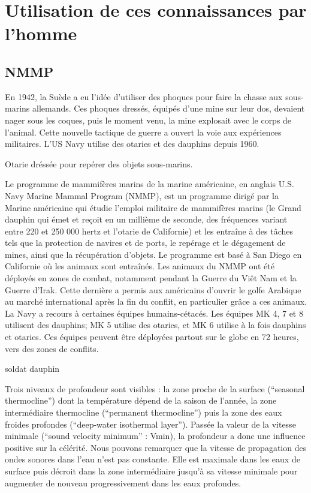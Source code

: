 \section{Utilisation de ces connaissances par l'homme}

\subsection{NMMP}

En 1942, la Suède a eu l'idée d'utiliser des phoques pour faire la
chasse aux sous-marins allemands. Ces phoques dressés, équipés d'une
mine sur leur dos, devaient nager sous les coques, puis le moment venu,
la mine explosait avec le corps de l'animal. Cette nouvelle tactique de
guerre a ouvert la voie aux expériences militaires. L'US Navy utilise
des otaries et des dauphins depuis 1960.

Otarie dréssée pour repérer des objets sous-marins.

Le programme de mammifères marins de la marine américaine, en anglais
U.S. Navy Marine Mammal Program (NMMP), est un programme dirigé par la
Marine américaine qui étudie l'emploi militaire de mammifères marins (le
Grand dauphin qui émet et reçoit en un millième de seconde, des
fréquences variant entre 220 et 250 000 hertz et l'otarie de Californie)
et les entraîne à des tâches tels que la protection de navires et de
ports, le repérage et le dégagement de mines, ainsi que la récupération
d'objets. Le programme est basé à San Diego en Californie où les animaux
sont entraînés. Les animaux du NMMP ont été déployés en zones de combat,
notamment pendant la Guerre du Viêt Nam et la Guerre d'Irak. Cette
dernière a permis aux américains d'ouvrir le golfe Arabique au marché
international après la fin du conflit, en particulier grâce a ces
animaux. La Navy a recours à certaines équipes humains-cétacés. Les
équipes MK 4, 7 et 8 utilisent des dauphins; MK 5 utilise des otaries,
et MK 6 utilise à la fois dauphins et otaries. Ces équipes peuvent être
déployées partout sur le globe en 72 heures, vers des zones de conflits.

soldat dauphin

Trois niveaux de profondeur sont visibles : la zone proche de la surface
(``seasonal thermocline'') dont la température dépend de la saison de
l'année, la zone intermédiaire thermocline (``permanent thermocline'')
puis la zone des eaux froides profondes (``deep-water isothermal
layer''). Passée la valeur de la vitesse minimale (``sound velocity
minimum'' : Vmin), la profondeur a donc une influence positive sur la
célérité. Nous pouvons remarquer que la vitesse de propagation des ondes
sonores dans l'eau n'est pas constante. Elle est maximale dans les eaux
de surface puis décroit dans la zone intermédiaire jusqu'à sa vitesse
minimale pour augmenter de nouveau progressivement dans les eaux
profondes.

